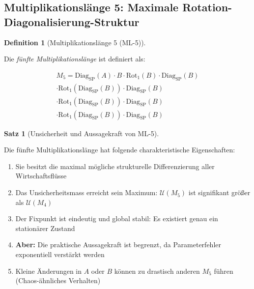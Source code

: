 \documentclass[a4paper,12pt]{article}
\theoremstyle{definition}
\newtheorem{definition}{Definition}
\newtheorem{satz}{Satz}
\begin{document}
\subsection{Multiplikationslänge 5: Maximale Rotation-Diagonalisierung-Struktur}

\begin{definition}[Multiplikationslänge 5 (ML-5)]
\label{def:ml5}

Die \emph{fünfte Multiplikationslänge} ist definiert als:

\begin{equation}
\begin{split}
M_5 = \text{Diag}_{\text{SP}}(A) \cdot B \cdot \text{Rot}_{1}(B) \cdot \text{Diag}_{\text{SP}}(B) \\
\cdot \text{Rot}_{1}(\text{Diag}_{\text{SP}}(B)) \cdot \text{Diag}_{\text{SP}}(B) \\
\cdot \text{Rot}_{1}(\text{Diag}_{\text{SP}}(B)) \cdot \text{Diag}_{\text{SP}}(B) \\
\cdot \text{Rot}_{1}(\text{Diag}_{\text{SP}}(B)) \cdot \text{Diag}_{\text{SP}}(B)
\end{split}
\end{equation}

\end{definition}

\begin{satz}[Unsicherheit und Aussagekraft von ML-5]
\label{satz:ml5_unsicherheit}

Die fünfte Multiplikationslänge hat folgende charakteristische Eigenschaften:

\begin{enumerate}
\item Sie besitzt die maximal mögliche strukturelle Differenzierung aller Wirtschaftsflüsse
\item Das Unsicherheitsmass erreicht sein Maximum: $\mathcal{U}(M_5)$ ist signifikant größer als $\mathcal{U}(M_4)$
\item Der Fixpunkt ist eindeutig und global stabil: Es existiert genau ein stationärer Zustand
\item \textbf{Aber:} Die praktische Aussagekraft ist begrenzt, da Parameterfehler exponentiell verstärkt werden
\item Kleine Änderungen in $A$ oder $B$ können zu drastisch anderen $M_5$ führen (Chaos-ähnliches Verhalten)
\end{enumerate}

\end{satz}
\end{document}
